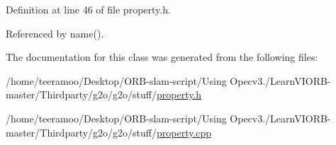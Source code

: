 Definition at line 46 of file property.\+h.



Referenced by name().



The documentation for this class was generated from the following files\+:\begin{DoxyCompactItemize}
\item 
/home/teeramoo/\+Desktop/\+O\+R\+B-\/slam-\/script/\+Using Opecv3./\+Learn\+V\+I\+O\+R\+B-\/master/\+Thirdparty/g2o/g2o/stuff/\hyperlink{property_8h}{property.\+h}\item 
/home/teeramoo/\+Desktop/\+O\+R\+B-\/slam-\/script/\+Using Opecv3./\+Learn\+V\+I\+O\+R\+B-\/master/\+Thirdparty/g2o/g2o/stuff/\hyperlink{property_8cpp}{property.\+cpp}\end{DoxyCompactItemize}
